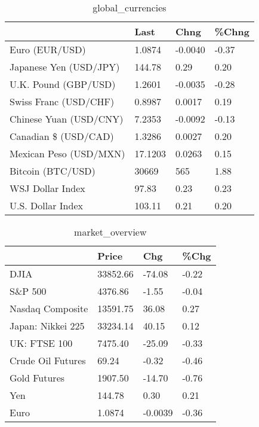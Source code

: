 \documentclass{article}%
\begin{document}
%


\begin{table}[htbp]%
\caption{global\_currencies}%
\centering%
\begin{adjustbox}{width=1\textwidth}%
\begin{tabular}{llll}
\toprule
                       &    Last &    Chng & \%Chng \\
\midrule
        Euro (EUR/USD) &  1.0874 & -0.0040 & -0.37 \\
Japanese Yen (USD/JPY) &  144.78 &    0.29 &  0.20 \\
  U.K. Pound (GBP/USD) &  1.2601 & -0.0035 & -0.28 \\
 Swiss Franc (USD/CHF) &  0.8987 &  0.0017 &  0.19 \\
Chinese Yuan (USD/CNY) &  7.2353 & -0.0092 & -0.13 \\
  Canadian \$ (USD/CAD) &  1.3286 &  0.0027 &  0.20 \\
Mexican Peso (USD/MXN) & 17.1203 &  0.0263 &  0.15 \\
     Bitcoin (BTC/USD) &   30669 &     565 &  1.88 \\
      WSJ Dollar Index &   97.83 &    0.23 &  0.23 \\
     U.S. Dollar Index &  103.11 &    0.21 &  0.20 \\
\bottomrule
\end{tabular}
%
\end{adjustbox}%
\end{table}

%


\begin{table}[htbp]%
\caption{market\_overview}%
\centering%
\begin{adjustbox}{width=1\textwidth}%
\begin{tabular}{llll}
\toprule
                  &    Price &     Chg &  \%Chg \\
\midrule
             DJIA & 33852.66 &  -74.08 & -0.22 \\
          S\&P 500 &  4376.86 &   -1.55 & -0.04 \\
 Nasdaq Composite & 13591.75 &   36.08 &  0.27 \\
Japan: Nikkei 225 & 33234.14 &   40.15 &  0.12 \\
     UK: FTSE 100 &  7475.40 &  -25.09 & -0.33 \\
Crude Oil Futures &    69.24 &   -0.32 & -0.46 \\
     Gold Futures &  1907.50 &  -14.70 & -0.76 \\
              Yen &   144.78 &    0.30 &  0.21 \\
             Euro &   1.0874 & -0.0039 & -0.36 \\
\bottomrule
\end{tabular}
%
\end{adjustbox}%
\end{table}

%
\end{document}
